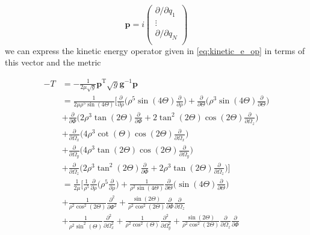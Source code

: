 \begin{equation}
\mathbf{p} = i 
\begin{pmatrix}
\partial/\partial q_1\\
\vdots\\
\partial/\partial q_N\\
\end{pmatrix}
\end{equation}
we can express the kinetic energy operator given in \eqref{eq:kinetic_e_op} in terms of this vector and the metric

\begin{equation}\label{eq:T_SW}
\begin{aligned}
-T &= -\frac{1}{2\mu \sqrt{g}} \mathbf{p}^\mathrm{T} \sqrt{g} \mathbf{g}^{-1} \mathbf{p}\\
&= \frac{1}{2\mu \rho^5 \sin(4\Theta)}\Bigg[ \frac{\partial}{\partial \rho} \Bigg(\rho^5 \sin(4 \Theta) \frac{\partial}{\partial \rho}\Bigg) + \frac{\partial}{\partial \Theta}\Bigg(\rho^3\sin(4\Theta)\frac{\partial}{\partial\Theta}\Bigg)\\ &+\frac{\partial}{\partial\Phi}\Bigg(2\rho^3\tan(2\Theta)\frac{\partial}{\partial\Phi} + 2\tan^2(2\Theta)\cos(2\Theta)\frac{\partial}{\partial\Omega_z}\Bigg)\\
&+\frac{\partial}{\partial\Omega_x}\Bigg(4\rho^3\cot(\Theta)\cos(2\Theta)\frac{\partial}{\partial\Omega_x}\Bigg)\\
&+\frac{\partial}{\partial\Omega_y}\Bigg(4\rho^3\tan(2\Theta)\cos(2\Theta)\frac{\partial}{\partial\Omega_y}\Bigg)\\
&+\frac{\partial}{\partial\Omega_z}\Bigg(2\rho^3\tan^2(2\Theta)\frac{\partial}{\partial\Phi}+2\rho^3\tan(2\Theta)\frac{\partial}{\partial\Omega_z}\Bigg)\Bigg]\\
&=\frac{1}{2\mu}\Bigg[\frac{1}{\rho^5}\frac{\partial}{\partial\rho}\Bigg(\rho^5\frac{\partial}{\partial\rho}\Bigg) + \frac{1}{\rho^2\sin(4\Theta)}\frac{\partial}{\partial\Theta}\Bigg(\sin(4\Theta)\frac{\partial}{\partial\Theta}\Bigg)\\
&+\frac{1}{\rho^2\cos^2(2\Theta)}\frac{\partial^2}{\partial\Phi^2} + \frac{\sin(2\Theta)}{\rho^2\cos^2(2\Theta)}\frac{\partial}{\partial\Phi}\frac{\partial}{\partial\Omega_z}\\
&+\frac{1}{\rho^2\sin^2(\Theta)}\frac{\partial^2}{\partial\Omega^2_x} + \frac{1}{\rho^2\cos^2(\Theta)}\frac{\partial^2}{\partial\Omega^2_y} + \frac{\sin(2\Theta)}{\rho^2\cos^2(2\Theta)}\frac{\partial}{\partial\Omega_z}\frac{\partial}{\partial\Phi}\\

\end{aligned}
\end{equation}
